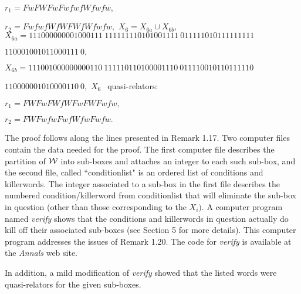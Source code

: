 $r_1 = FwFWFwFwfwfWfwfw,$

$r_2 = FwfwfWfWFWfWfwfw,$
\vfil
\noindent $X_6 = X_{6a} \cup X_{6b},$
\vfil
\noindent $X_{6a} = 
111000000001000111\ 
111111110101001111\ 
011111010111111111$\hfill

\hfill  
$110001001011000111\ 0,$

\noindent $X_{6b} = 
111001000000000110\ 
111110110100001110\ 
011110010110111110$\hfill

\hfill  
$110000001010000110\ 0,$
\noindent $X_6\ \ $ quasi\/{\rm -}\/relators\/{\rm :}\/

$r_1 = FWFwFWfWFwFWFwfw,$

$r_2 = FWFwfwFwfWfwFwfw.$
\endproclaim

 
The proof follows along the lines presented in Remark 1.17.  
Two computer files contain the data needed for the proof.   
The first computer file describes the partition of ${\cal W}$ into
sub-boxes and attaches an integer to each such sub-box, 
and the second file, called ``conditionlist" is an ordered list of conditions and killerwords.
The integer associated to a sub-box in the first file describes the numbered condition/killerword from   conditionlist that will eliminate the sub-box
in question (other than those corresponding to the $X_i).$ A computer program named {\it verify} shows
that the conditions and killerwords in question actually do kill off their associated sub-boxes (see Section 5 for more details).  This computer
program addresses the issues of Remark 1.20.  The code for {\it
verify} is available at the {\it Annals} web site. 

In addition, a mild modification of {\it verify} showed that the listed words were quasi-relators for the given sub-boxes. 
\enddemo


